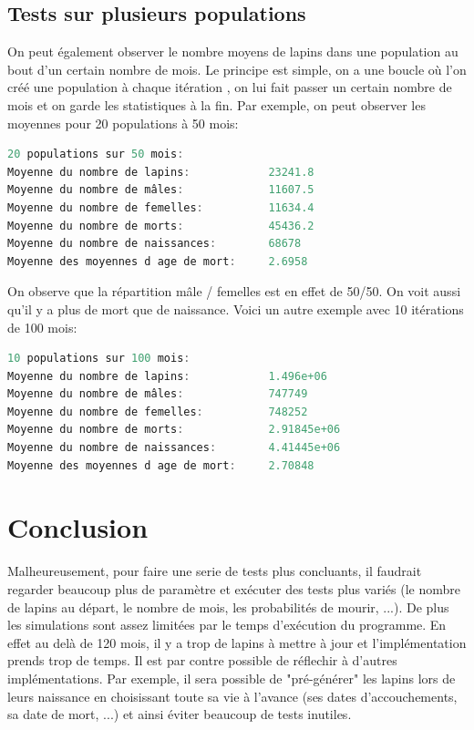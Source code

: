 \documentclass{article}
\begin{document}
\subsection{Tests sur plusieurs populations}
On peut également observer le nombre moyens de lapins dans une population au bout d'un certain
nombre de mois. Le principe est simple, on a une boucle où l'on créé une population à chaque itération
, on lui fait passer un certain nombre de mois et on garde les statistiques à la fin. Par exemple,
on peut observer les moyennes pour 20 populations à 50 mois:
\begin{lstlisting}[language=c++]
20 populations sur 50 mois:
Moyenne du nombre de lapins:            23241.8
Moyenne du nombre de mâles:             11607.5
Moyenne du nombre de femelles:          11634.4
Moyenne du nombre de morts:             45436.2
Moyenne du nombre de naissances:        68678
Moyenne des moyennes d age de mort:     2.6958
\end{lstlisting}
On observe que la répartition mâle / femelles est en effet de 50/50. On voit aussi qu'il y a
plus de mort que de naissance. Voici un autre exemple avec 10 itérations de 100 mois:
\begin{lstlisting}[language=c++]
10 populations sur 100 mois:
Moyenne du nombre de lapins:            1.496e+06
Moyenne du nombre de mâles:             747749
Moyenne du nombre de femelles:          748252
Moyenne du nombre de morts:             2.91845e+06
Moyenne du nombre de naissances:        4.41445e+06
Moyenne des moyennes d age de mort:     2.70848
\end{lstlisting}

\section{Conclusion}
Malheureusement, pour faire une serie de tests plus concluants, il faudrait regarder beaucoup
plus de paramètre et exécuter des tests plus variés (le nombre de lapins au départ, le nombre
de mois, les probabilités de mourir, ...). De plus les simulations sont assez limitées par le
temps d'exécution du programme. En effet au delà de 120 mois, il y a trop de lapins à mettre à jour
et l'implémentation prends trop de temps. Il est par contre possible de réflechir à d'autres
implémentations. Par exemple, il sera possible de "pré-générer" les lapins lors de leurs naissance
en choisissant toute sa vie à l'avance (ses dates d'accouchements, sa date de mort, ...) et ainsi
éviter beaucoup de tests inutiles.
\end{document}
